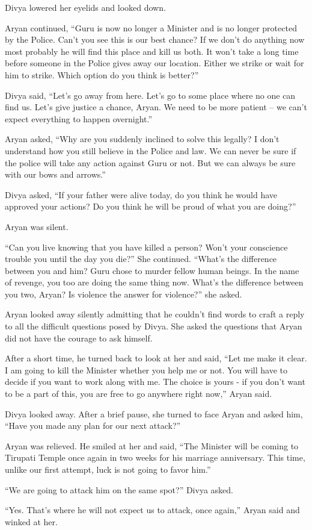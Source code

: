Divya lowered her eyelids and looked down.

Aryan continued, “Guru is now no longer a Minister and is no longer protected by
the Police. Can't you see this is our best chance? If we don't do anything now
most probably he will find this place and kill us both. It won't take a long
time before someone in the Police gives away our location. Either we strike or
wait for him to strike. Which option do you think is better?”

Divya said, “Let's go away from here. Let's go to some place where no one can
find us. Let's give justice a chance, Aryan. We need to be more patient – we
can't expect everything to happen overnight.”

Aryan asked, “Why are you suddenly inclined to solve this legally? I don't
understand how you still believe in the Police and law. We can never be sure if
the police will take any action against Guru or not. But we can always be sure
with our bows and arrows.”

Divya asked, “If your father were alive today, do you think he would have
approved your actions? Do you think he will be proud of what you are doing?”

Aryan was silent.

“Can you live knowing that you have killed a person? Won't your conscience
trouble you until the day you die?” She continued. “What's the difference
between you and him? Guru chose to murder fellow human beings. In the name of
revenge, you too are doing the same thing now. What's the difference between you
two, Aryan? Is violence the answer for violence?” she asked.

Aryan looked away silently admitting that he couldn't find words to craft a
reply to all the difficult questions posed by Divya. She asked the questions
that Aryan did not have the courage to ask himself.

After a short time, he turned back to look at her and said, “Let me make it
clear. I am going to kill the Minister whether you help me or not. You will have
to decide if you want to work along with me. The choice is yours - if you don't
want to be a part of this, you are free to go anywhere right now,” Aryan said.

Divya looked away. After a brief pause, she turned to face Aryan and asked him,
“Have you made any plan for our next attack?”

Aryan was relieved. He smiled at her and said, “The Minister will be coming to
Tirupati Temple once again in two weeks for his marriage anniversary. This time,
unlike our first attempt, luck is not going to favor him.”

“We are going to attack him on the same spot?” Divya asked.

“Yes. That's where he will not expect us to attack, once again,” Aryan said and
winked at her.